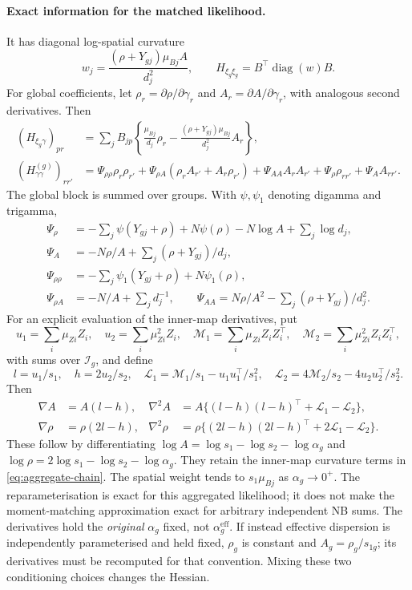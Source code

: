 \documentclass[11pt,a4paper]{article}
\newcommand{\diag}{\operatorname{diag}}
\numberwithin{equation}{section}
\begin{document}
\paragraph{Exact information for the matched likelihood.}
It has diagonal log-spatial curvature
\begin{equation}\label{eq:aggregate-weight}
 w_j=\frac{(\rho+Y_{gj})\mu_{Bj}A}{d_j^2},\qquad
 H_{\xi_g\xi_g}=B^\top\diag(w)B.
\end{equation}
For global coefficients, let $\rho_r=\partial\rho/\partial\gamma_r$ and
$A_r=\partial A/\partial\gamma_r$, with analogous second derivatives.
Then
\begin{align}
 (H_{\xi_g\gamma})_{pr}
 &=\sum_j B_{jp}\left\{\frac{\mu_{Bj}}{d_j}\rho_r
       -\frac{(\rho+Y_{gj})\mu_{Bj}}{d_j^2}A_r\right\},\\
 (H_{\gamma\gamma}^{(g)})_{rr'}
 &=\Psi_{\rho\rho}\rho_r\rho_{r'}
 +\Psi_{\rho A}(\rho_rA_{r'}+A_r\rho_{r'})
 +\Psi_{AA}A_rA_{r'}+\Psi_\rho\rho_{rr'}+\Psi_A A_{rr'}.
 \label{eq:aggregate-chain}
\end{align}
The global block is summed over groups. With $\psi,\psi_1$ denoting digamma
and trigamma,
\begin{align}
 \Psi_\rho&=-\sum_j\psi(Y_{gj}+\rho)+N\psi(\rho)-N\log A+\sum_j\log d_j,\\
 \Psi_A&=-N\rho/A+\sum_j(\rho+Y_{gj})/d_j,\\
 \Psi_{\rho\rho}&=-\sum_j\psi_1(Y_{gj}+\rho)+N\psi_1(\rho),\\
 \Psi_{\rho A}&=-N/A+\sum_jd_j^{-1},\qquad
 \Psi_{AA}=N\rho/A^2-\sum_j(\rho+Y_{gj})/d_j^2.
\end{align}
For an explicit evaluation of the inner-map derivatives, put
\[
 u_1=\sum_i\mu_{Zi}Z_i,\quad u_2=\sum_i\mu_{Zi}^2Z_i,\quad
 \mathcal M_1=\sum_i\mu_{Zi}Z_iZ_i^\top,\quad
 \mathcal M_2=\sum_i\mu_{Zi}^2Z_iZ_i^\top,
\]
with sums over $\mathcal I_g$, and define
\[
 l=u_1/s_1,\quad h=2u_2/s_2,\quad
 \mathcal L_1=\mathcal M_1/s_1-u_1u_1^\top/s_1^2,\quad
 \mathcal L_2=4\mathcal M_2/s_2-4u_2u_2^\top/s_2^2.
\]
Then
\begin{align}
 \nabla A&=A(l-h),&
 \nabla^2 A&=A\{(l-h)(l-h)^\top+\mathcal L_1-\mathcal L_2\},\\
 \nabla\rho&=\rho(2l-h),&
 \nabla^2\rho&=\rho\{(2l-h)(2l-h)^\top+2\mathcal L_1-\mathcal L_2\}.
\end{align}
These follow by differentiating
$\log A=\log s_1-\log s_2-\log\alpha_g$ and
$\log\rho=2\log s_1-\log s_2-\log\alpha_g$.
They retain the inner-map curvature terms in \eqref{eq:aggregate-chain}.
The spatial weight tends to $s_1\mu_{Bj}$ as $\alpha_g\to0^+$.
The reparameterisation is exact for this aggregated likelihood; it does not
make the moment-matching approximation exact for arbitrary independent NB sums.
The derivatives hold the \emph{original} $\alpha_g$ fixed, not
$\alpha_g^{\mathrm{eff}}$. If instead effective dispersion is independently
parameterised and held fixed, $\rho_g$ is constant and $A_g=\rho_g/s_{1g}$;
its derivatives must be recomputed for that convention. Mixing these two
conditioning choices changes the Hessian.
\end{document}
